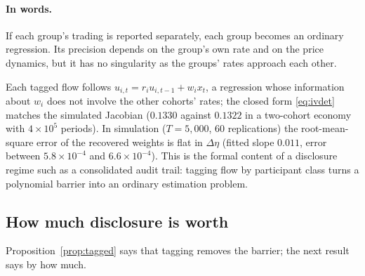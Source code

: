 \documentclass[12pt]{article}
\theoremstyle{definition}
\theoremstyle{remark}
\begin{document}
\paragraph{In words.} If each group's trading is reported separately, each group becomes an ordinary regression. Its precision depends on the group's own rate and on the price dynamics, but it has no singularity as the groups' rates approach each other.


Each tagged flow follows $u_{i,t}=r_iu_{i,t-1}+w_ix_t$, a regression whose information about $w_i$ does not involve the other cohorts' rates; the closed form \eqref{eq:ivdet} matches the simulated Jacobian ($0.1330$ against $0.1322$ in a two-cohort economy with $4\times10^5$ periods). In simulation ($T=5{,}000$, 60 replications) the root-mean-square error of the recovered weights is flat in $\Delta\eta$ (fitted slope $0.011$, error between $5.8\times10^{-4}$ and $6.6\times10^{-4}$). This is the formal content of a disclosure regime such as a consolidated audit trail: tagging flow by participant class turns a polynomial barrier into an ordinary estimation problem.

\subsection{How much disclosure is worth}\label{sec:discvalue}

Proposition~\ref{prop:tagged} says that tagging removes the barrier; the next result says by how much.
\end{document}
